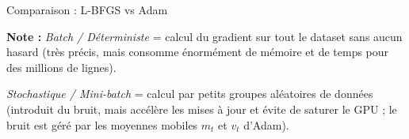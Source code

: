 \documentclass{beamer}
\begin{document}
\begin{frame}{Comparaison : L-BFGS vs Adam}
    \begin{table}
        \centering
        \caption{Tableau comparatif des optimiseurs L-BFGS et Adam.}
    \end{table}
    \vspace{0.2cm}
    \tiny{\textbf{Note :} \textit{Batch / Déterministe} = calcul du gradient sur tout le dataset sans aucun hasard (très précis, mais consomme énormément de mémoire et de temps pour des millions de lignes). 
    
    \textit{Stochastique / Mini-batch} = calcul par petits groupes aléatoires de données (introduit du bruit, mais accélère les mises à jour et évite de saturer le GPU ; le bruit est géré par les moyennes mobiles $m_t$ et $v_t$ d'Adam).}

\end{frame}
\end{document}
